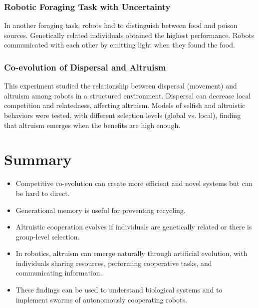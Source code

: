 \subsubsection*{Robotic Foraging Task with Uncertainty}
In another foraging task, robots had to distinguish between food and poison sources. Genetically related individuals obtained the highest performance.  Robots communicated with each other by emitting light when they found the food.

\subsubsection*{Co-evolution of Dispersal and Altruism}
This experiment studied the relationship between dispersal (movement) and altruism among robots in a structured environment.  Dispersal can decrease local competition and relatedness, affecting altruism.  Models of selfish and altruistic behaviors were tested, with different selection levels (global vs. local), finding that altruism emerges when the benefits are high enough.

\section*{Summary}

\begin{itemize}
    \item Competitive co-evolution can create more efficient and novel systems but can be hard to direct.
    \item Generational memory is useful for preventing recycling.
    \item Altruistic cooperation evolves if individuals are genetically related or there is group-level selection.
    \item In robotics, altruism can emerge naturally through artificial evolution, with individuals sharing resources, performing cooperative tasks, and communicating information.
    \item These findings can be used to understand biological systems and to implement swarms of autonomously cooperating robots.
\end{itemize}


